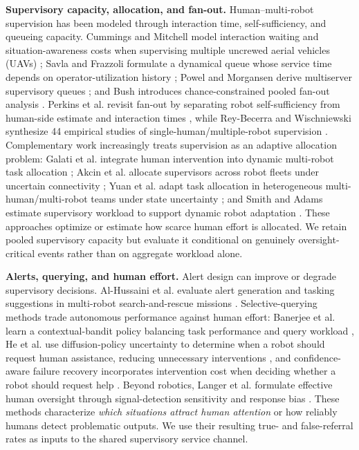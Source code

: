 \documentclass[letterpaper,10pt,conference]{ieeeconf}
\begin{document}
\textbf{Supervisory capacity, allocation, and fan-out.}
Human--multi-robot supervision has been modeled through interaction time, self-sufficiency, and queueing capacity. Cummings and Mitchell model interaction waiting and situation-awareness costs when supervising multiple uncrewed aerial vehicles (UAVs) \cite{cummings2008capacity}; Savla and Frazzoli formulate a dynamical queue whose service time depends on operator-utilization history \cite{savla2012queue}; Powel and Morgansen derive multiserver supervisory queues \cite{powel2012multiserver}; and Bush introduces chance-constrained pooled fan-out analysis \cite{bush2015suave}. Perkins et al. revisit fan-out by separating robot self-sufficiency from human-side estimate and interaction times \cite{perkins2025fanout}, while Rey-Becerra and Wischniewski synthesize 44 empirical studies of single-human/multiple-robot supervision \cite{reybecerra2026review}. Complementary work increasingly treats supervision as an adaptive allocation problem: Galati et al. integrate human intervention into dynamic multi-robot task allocation \cite{galati2023auction}; Akcin et al. allocate supervisors across robot fleets under uncertain connectivity \cite{akcin2025fleet}; Yuan et al. adapt task allocation in heterogeneous multi-human/multi-robot teams under state uncertainty \cite{yuan2025adaptive}; and Smith and Adams estimate supervisory workload to support dynamic robot adaptation \cite{smith2026workload}. These approaches optimize or estimate how scarce human effort is allocated. We retain pooled supervisory capacity but evaluate it conditional on genuinely oversight-critical events rather than on aggregate workload alone.

\textbf{Alerts, querying, and human effort.}
Alert design can improve or degrade supervisory decisions. Al-Hussaini et al. evaluate alert generation and tasking suggestions in multi-robot search-and-rescue missions \cite{alhussaini2024alerts}. Selective-querying methods trade autonomous performance against human effort: Banerjee et al. learn a contextual-bandit policy balancing task performance and query workload \cite{banerjee2025ask}, He et al. use diffusion-policy uncertainty to determine when a robot should request human assistance, reducing unnecessary interventions \cite{he2026uncertainty}, and confidence-aware failure recovery incorporates intervention cost when deciding whether a robot should request help \cite{banerjee2026failure}. Beyond robotics, Langer et al. formulate effective human oversight through signal-detection sensitivity and response bias \cite{langer2025oversight}. These methods characterize \emph{which situations attract human attention} or how reliably humans detect problematic outputs. We use their resulting true- and false-referral rates as inputs to the shared supervisory service channel.
\end{document}
